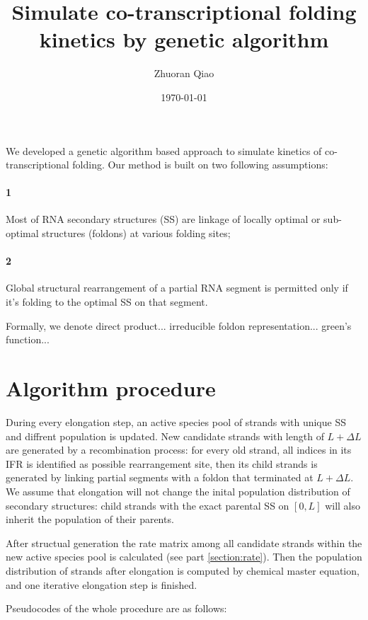 \documentclass[11pt, a4paper]{article}
\begin{document}
\title{Simulate co-transcriptional folding kinetics by genetic algorithm}
\author{Zhuoran Qiao}
\date{\today}

\maketitle

We developed a genetic algorithm based approach to simulate kinetics of co-transcriptional folding. Our method is built on two following assumptions:
\paragraph{1} Most of RNA secondary structures (SS) are linkage of locally optimal or sub-optimal structures (foldons) at various folding sites;
\paragraph{2} Global structural rearrangement of a partial RNA segment is permitted only if it's folding to the optimal SS on that segment.

Formally, we denote direct product... irreducible foldon representation... green's function...

\section{Algorithm procedure}

During every elongation step, an active species pool of strands with unique SS and diffrent population is updated. New candidate strands with length of $L+\Delta L$ are generated by a recombination
process: for every old strand, all indices in its IFR is identified as possible rearrangement site, then its child strands is generated by linking partial segments
with a foldon that terminated at $L+\Delta L$. We assume that elongation will not change the inital population distribution of secondary structures: child strands with the exact
parental SS on $[0, L]$ will also inherit the population of their parents.

After structual generation the rate matrix among all candidate strands within the new active species pool is calculated (see part \ref{section:rate}). Then the population
distribution of strands after elongation is computed by chemical master equation, and one iterative elongation step is finished.

Pseudocodes of the whole procedure are as follows:
\end{document}
